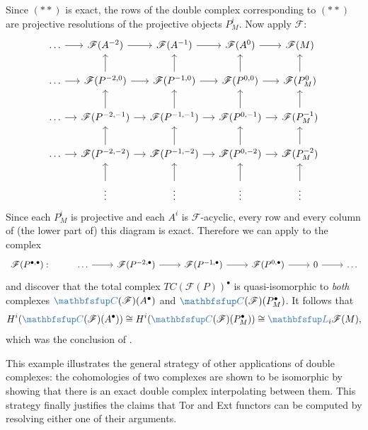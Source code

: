 Since $(**)$ is exact, the rows of the double complex corresponding to
$(**)$ are projective resolutions of the projective objects
$P_M^i$. Now apply $\mathscr{F}$:
\[\begin{tikzcd}[column sep=small]
    \dots \arrow[r] & \mathscr{F}(A^{-2}) \arrow[r] &
    \mathscr{F}(A^{-1})
    \arrow[r] & \mathscr{F}(A^0) \arrow[r] & \mathscr{F}(M) \\
    \dots \arrow[r] & \mathscr{F}(P^{-2,0}) \arrow[r] \arrow[u] &
    \mathscr{F}(P^{-1,0}) \arrow[r] \arrow[u] & \mathscr{F}(P^{0,0})
    \arrow[r] \arrow[u] & \mathscr{F}(P_M^0) \arrow[u] \\
    \dots \arrow[r] & \mathscr{F}(P^{-2,-1}) \arrow[r] \arrow[u] &
    \mathscr{F}(P^{-1,-1}) \arrow[r] \arrow[u] & \mathscr{F}(P^{0,-1})
    \arrow[r] \arrow[u] & \mathscr{F}(P_M^{-1}) \arrow[u] \\
    \dots \arrow[r] & \mathscr{F}(P^{-2,-2}) \arrow[r] \arrow[u] &
    \mathscr{F}(P^{-1,-2}) \arrow[r] \arrow[u] & \mathscr{F}(P^{0,-2})
    \arrow[r] \arrow[u] & \mathscr{F}(P_M^{-2}) \arrow[u] \\
    & \vdots \arrow[u] & \vdots \arrow[u] & \vdots \arrow[u] & \vdots
    \arrow[u]
  \end{tikzcd}\] Since each $P_M^i$ is projective and each $A^i$ is
$\mathscr{F}$-acyclic, every row and every column of (the lower part
of) this diagram is exact. Therefore we can apply
 to the complex
\[\begin{tikzcd}
    \mathscr{F}(P^{\bullet,\bullet}) : & \dots \arrow[r] &
    \mathscr{F}(P^{-2,\bullet}) \arrow[r] &
    \mathscr{F}(P^{-1,\bullet}) \arrow[r] & \mathscr{F}(P^{0,\bullet})
    \arrow[r] & 0 \arrow[r] & \dots
  \end{tikzcd}\] and discover that the total complex
$TC(\mathscr{F}(P))^\bullet$ is quasi-isomorphic to \emph{both}
complexes $\categ{C}(\mathscr{F})(A^\bullet)$ and
$\categ{C}(\mathscr{F})(P_M^\bullet)$. It follows that
\[
  H^i(\categ{C}(\mathscr{F})(A^\bullet)) \cong
  H^i(\categ{C}(\mathscr{F})(P_M^\bullet)) \cong
  \categ{L}_i\mathscr{F}(M),
\]
which was the conclusion of .

This example illustrates the general strategy of other applications of
double complexes: the cohomologies of two complexes are shown to be
isomorphic by showing that there is an exact double complex
interpolating between them. This strategy finally justifies the claims
that Tor and Ext functors can be computed by resolving either one of
their arguments.

